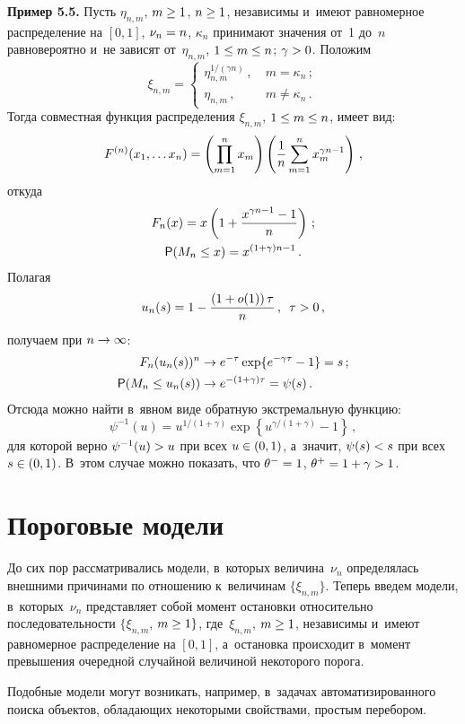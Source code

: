 \begin{multicols}{2}
\smallskip

\noindent
\textbf{Пример 5.5.} Пусть $\eta_{n,m}$, $m\hm\ge 1$, $n\hm\ge 1$,
независимы и~имеют равномерное распределение на $[0,1]$, $\nu_n\hm=n$,
$\kappa_n$ принимают значения от~1 до~$n$ равновероятно и~не
зависят от~$\eta_{n,m}$,
$1\hm\le m\hm\le n$; $\gamma\hm>0$. Положим
$$
\xi_{n,m}=\begin{cases}
\eta_{n,m}^{1/(\gamma n)}\,, &\ m=\kappa_n\,;\\
\eta_{n,m}\,, &\ m\ne\kappa_n\,.
\end{cases}
$$
Тогда совместная функция распределения $\xi_{n,m}$, $1\hm\le m\hm\le n$, имеет вид:
$$
F^{(n)}(x_1,\dots x_n)=\left(\prod\limits_{m=1}^n x_m\right)
\left(\displaystyle\frac{\displaystyle 1\mathstrut}{\displaystyle n\mathstrut}\sum\limits_{m=1}^n x_m^{\gamma n-1}\right)\,,
$$
откуда
\begin{gather*}
F_n(x)=x\left(1+\displaystyle\frac{\displaystyle x^{\gamma n-1}-1\mathstrut}{\displaystyle n\mathstrut}\right)\,;\\
{\sf P}(M_n\le x)=x^{(1+\gamma)n-1}\,.
\end{gather*}
Полагая 
$$
u_n(s)=1-\displaystyle\frac{\displaystyle \left(1+o(1)\right)\tau\mathstrut}{\displaystyle n\mathstrut}\,,\enskip 
\tau>0\,,
$$
 получаем при $n\hm\to\infty$:
\begin{align*}
F_n(u_n(s))^n&\to e^{-\tau}\exp\{e^{-\gamma\tau}-1\}=s\,;\\
 {\sf P}(M_n\le u_n(s))&\to e^{-(1+\gamma)\tau}=\psi(s)\,.
 \end{align*}
Отсюда можно найти в~явном виде обратную экстремальную функцию:
$$
\psi^{-1}(u)=u^{1/(1+\gamma)}\exp\left\{u^{\gamma/(1+\gamma)}-1\right\}\,,
$$
для которой верно $\psi^{-1}(u)\hm>u$ при всех $u\hm\in (0,1)$,
а~значит, $\psi(s)\hm<s$ при всех $s\hm\in (0,1)$.
В~этом случае можно показать, что $\theta^-\hm=1$, $\theta^+\hm=1\hm+\gamma>1$.

\section{Пороговые модели}

До сих пор рассматривались модели, в~которых величина~$\nu_n$
определялась внешними причинами по отношению к~величинам $\{\xi_{n,m}\}$.
Теперь введем
модели, в~которых~$\nu_n$ представляет собой момент остановки относительно
последовательности
$\{\xi_{n,m}$, $m\hm\ge 1\}$, где~$\xi_{n,m}$, $m\hm\ge 1$, независимы
и~имеют равномерное распределение
на $[0,1]$, а~остановка происходит в~момент превышения очередной случайной величиной
некоторого порога.

Подобные модели могут возникать, например, в~задачах автоматизированного
поиска объектов, обладающих некоторыми свойствами, простым перебором.


\end{multicols}
